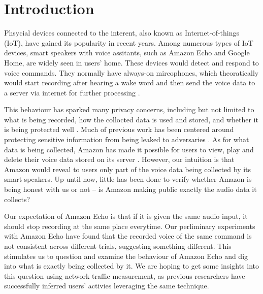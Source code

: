 \section{Introduction}
Phsycial devices connected to the interent, also known as Internet-of-things (IoT), have gained its popularity in recent years. Among numerous types of IoT devices, smart speakers with voice assitants, such as Amazon Echo and Google Home, are widely seen in users' home. These devices would detect and respond to voice commands. They normally have always-on mircophones, which theoratically would start recording after hearing a wake word and then send the voice data to a server via internet for further processing \cite{AmazonEc68:online}.

This behaviour has sparked many privacy concerns, including but not limited to what is being recorded, how the collocted data is used and stored, and whether it is being protected well \cite{lau2018alexa, fowler_2019, apthorpe2017smart, apthorpe2019keeping, apthorpe2017spying}. Much of previous work has been centered around protecting sensitive information from being leaked to adversaries \cite{apthorpe2017smart, apthorpe2019keeping, apthorpe2017spying}. As for what data is being collected, Amazon has made it possible for users to view, play and delete their voice data stored on its server \cite{ford2019alexa}. However, our intuition is that Amazon would reveal to users only part of the voice data being collected by its smart speakers. Up until now, little has been done to verify whether Amazon is being honest with us or not -- is Amazon making public exactly the audio data it collects?

Our expectation of Amazon Echo is that if it is given the same audio input, it should stop recording at the same place everytime. Our perliminary experiments with Amazon Echo have found that the recorded voice of the same command is not consistent across different trials, suggesting something different. This stimulates us to question and examine the behaviour of Amazon Echo and dig into what is exactly being collected by it. We are hoping to get some insights into this question using network traffic measurement, as previous researchers \cite{apthorpe2017spying} have successfully inferred users' activies leveraging the same technique.